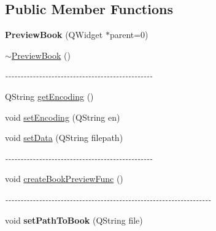 \subsection*{Public Member Functions}
\begin{DoxyCompactItemize}
\item 
\hypertarget{classPreviewBook_a3b6b30ac1a87bf04296cab9354a66f77}{
{\bfseries PreviewBook} (QWidget $\ast$parent=0)}
\label{classPreviewBook_a3b6b30ac1a87bf04296cab9354a66f77}

\item 
\hypertarget{classPreviewBook_a35b5443ffa845700e17623b5738830b4}{
\hyperlink{classPreviewBook_a35b5443ffa845700e17623b5738830b4}{$\sim$PreviewBook} ()}
\label{classPreviewBook_a35b5443ffa845700e17623b5738830b4}

\begin{DoxyCompactList}\small\item\em -\/-\/-\/-\/-\/-\/-\/-\/-\/-\/-\/-\/-\/-\/-\/-\/-\/-\/-\/-\/-\/-\/-\/-\/-\/-\/-\/-\/-\/-\/-\/-\/-\/-\/-\/-\/-\/-\/-\/-\/-\/-\/-\/-\/-\/-\/-\/-\/ \item\end{DoxyCompactList}\item 
QString \hyperlink{classPreviewBook_a81b8d824cf9a4b6ce5a56220fca758bb}{getEncoding} ()
\item 
void \hyperlink{classPreviewBook_acb1946f62ee2df3e205b78292683770c}{setEncoding} (QString en)
\item 
void \hyperlink{classPreviewBook_a3c75611671fd48e0303ea9807b81f46e}{setData} (QString filepath)
\begin{DoxyCompactList}\small\item\em -\/-\/-\/-\/-\/-\/-\/-\/-\/-\/-\/-\/-\/-\/-\/-\/-\/-\/-\/-\/-\/-\/-\/-\/-\/-\/-\/-\/-\/-\/-\/-\/-\/-\/-\/-\/-\/-\/-\/-\/-\/-\/-\/-\/-\/-\/-\/-\/ \item\end{DoxyCompactList}\item 
void \hyperlink{classPreviewBook_acc47dae2c409706edea81a7a723d0daf}{createBookPreviewFunc} ()
\begin{DoxyCompactList}\small\item\em -\/-\/-\/-\/-\/-\/-\/-\/-\/-\/-\/-\/-\/-\/-\/-\/-\/-\/-\/-\/-\/-\/-\/-\/-\/-\/-\/-\/-\/-\/-\/-\/-\/-\/-\/-\/-\/-\/-\/-\/-\/-\/-\/-\/-\/-\/-\/-\/-\/-\/-\/-\/-\/-\/-\/-\/-\/-\/-\/-\/-\/-\/-\/-\/-\/-\/-\/ \item\end{DoxyCompactList}\item 
\hypertarget{classPreviewBook_a8861a0dd24810ba90da9c0ffb331f11e}{
void {\bfseries setPathToBook} (QString file)}
\label{classPreviewBook_a8861a0dd24810ba90da9c0ffb331f11e}

\end{DoxyCompactItemize}



